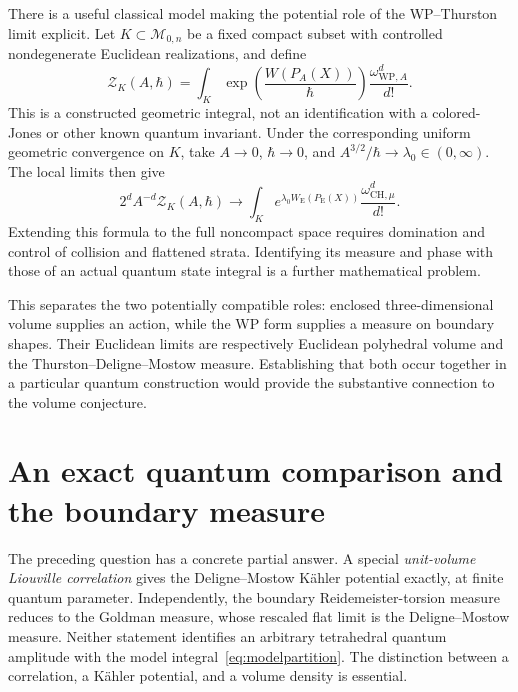 \documentclass[11pt,a4paper]{article}
\numberwithin{equation}{section}
\theoremstyle{definition}
\theoremstyle{remark}
\newcommand{\WP}{\mathrm{WP}}
\newcommand{\M}{\mathcal M}
\begin{document}
There is a useful classical model making the potential role of
 the WP--Thurston limit explicit. Let $K\subset\M_{0,n}$ be a
 fixed compact subset with controlled nondegenerate Euclidean
 realizations, and define
\begin{equation}
 \mathcal Z_K(A,\hbar)=\int_K
       \exp\left(\frac{W(P_A(X))}{\hbar}\right)
       \frac{\omega_{\WP,A}^d}{d!}.
 \label{eq:modelpartition}
\end{equation}
This is a constructed geometric integral, not an identification
with a colored-Jones or other known quantum invariant. Under the
corresponding uniform geometric convergence on $K$, take
$A\to0$, $\hbar\to0$, and $A^{3/2}/\hbar\to\lambda_0\in(0,\infty)$.
The local limits then give
\begin{equation}
 2^d A^{-d}\mathcal Z_K(A,\hbar)\longrightarrow
 \int_K e^{\lambda_0 W_{\mathrm E}(P_{\mathrm E}(X))}
                 \frac{\omega_{\mathrm{CH},\mu}^d}{d!}.
 \label{eq:modelpartitionlimit}
\end{equation}
Extending this formula to the full noncompact space requires
 domination and control of collision and flattened strata.
 Identifying its measure and phase with those of an actual quantum
 state integral is a further mathematical problem.

This separates the two potentially compatible roles: enclosed
three-dimensional volume supplies an action, while the WP form
supplies a measure on boundary shapes. Their Euclidean limits
are respectively Euclidean polyhedral volume and the
Thurston--Deligne--Mostow measure. Establishing that both occur
together in a particular quantum construction would provide the
substantive connection to the volume conjecture.


\section{An exact quantum comparison and the boundary measure}
\label{sec:quantummeasure}

The preceding question has a concrete partial answer. A special
\emph{unit-volume Liouville correlation} gives the Deligne--Mostow
K\"ahler potential exactly, at finite quantum parameter. Independently,
the boundary Reidemeister-torsion measure reduces to the Goldman measure,
whose rescaled flat limit is the Deligne--Mostow measure. Neither
statement identifies an arbitrary tetrahedral quantum amplitude with
the model integral~\eqref{eq:modelpartition}. The distinction between a
correlation, a K\"ahler potential, and a volume density is essential.
\end{document}
